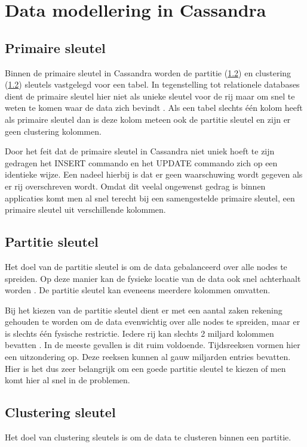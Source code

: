 \chapter{Data modellering in Cassandra}
\label{ch:cassandra_modelling}
\section{Primaire sleutel}
Binnen de primaire sleutel in Cassandra worden de partitie (\ref{partition_key}) en clustering (\ref{partition_key}) sleutels vastgelegd voor een tabel.
In tegenstelling tot relationele databases dient de primaire sleutel hier niet als unieke sleutel voor de rij maar om snel te weten te komen waar de data zich bevindt \citep{kan2014cassandra}.
Als een tabel slechts één kolom heeft als primaire sleutel dan is deze kolom meteen ook de partitie sleutel en zijn er geen clustering kolommen.

Door het feit dat de primaire sleutel in Cassandra niet uniek hoeft te zijn gedragen het INSERT commando en het UPDATE commando zich op een identieke wijze.
Een nadeel hierbij is dat er geen waarschuwing wordt gegeven als er rij overschreven wordt.
Omdat dit veelal ongewenst gedrag is binnen applicaties komt men al snel terecht bij een samengestelde primaire sleutel, een primaire sleutel uit verschillende kolommen.

\section{Partitie sleutel}
\label{partition_key}
Het doel van de partitie sleutel is om de data gebalanceerd over alle nodes te spreiden.
Op deze manier kan de fysieke locatie van de data ook snel achterhaalt worden \citep{kan2014cassandra}.
De partitie sleutel kan eveneens meerdere kolommen omvatten.

Bij het kiezen van de partitie sleutel dient er met een aantal zaken rekening gehouden te worden om de data evenwichtig over alle nodes te spreiden, maar er is slechts één fysische restrictie.
Iedere rij kan slechts 2 miljard kolommen bevatten \citep{McFadin2013Timeseries}.
In de meeste gevallen is dit ruim voldoende.
Tijdsreeksen vormen hier een uitzondering op.
Deze reeksen kunnen al gauw miljarden entries bevatten.
Hier is het dus zeer belangrijk om een goede partitie sleutel te kiezen of men komt hier al snel in de problemen.

\section{Clustering sleutel}
\label{clustering_key}
Het doel van clustering sleutels is om de data te clusteren binnen een partitie.

